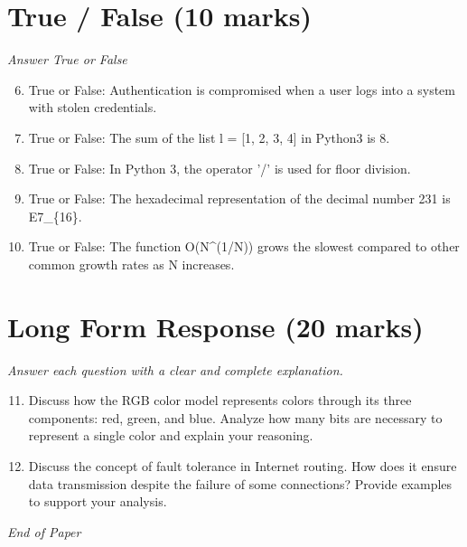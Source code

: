 \documentclass[12pt]{article}
\begin{document}
\section*{True / False (10 marks)}
\textit{Answer True or False}
\begin{enumerate}[label=\arabic*.]
\setcounter{enumi}{5}
\item True or False: Authentication is compromised when a user logs into a system with stolen credentials.
\item True or False: The sum of the list l = [1, 2, 3, 4] in Python3 is 8.
\item True or False: In Python 3, the operator '/' is used for floor division.
\item True or False: The hexadecimal representation of the decimal number 231 is E7\_\{16\}.
\item True or False: The function O(N\^{}(1/N)) grows the slowest compared to other common growth rates as N increases.
\end{enumerate}

\section*{Long Form Response (20 marks)}
\textit{Answer each question with a clear and complete explanation.}
\begin{enumerate}[label=\arabic*.]
\setcounter{enumi}{10}
\item Discuss how the RGB color model represents colors through its three components: red,
green, and blue. Analyze how many bits are necessary to represent a single color and
explain your reasoning.
\item Discuss the concept of fault tolerance in Internet routing. How does it ensure data
transmission despite the failure of some connections? Provide examples to support your
analysis.
\end{enumerate}

\vfill
\noindent\textit{End of Paper}
\end{document}
